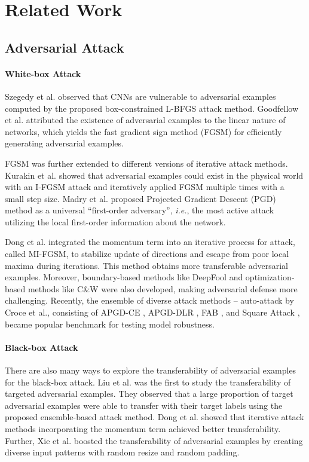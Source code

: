 \documentclass[10pt,twocolumn,letterpaper]{article}
\begin{document}
\section{Related Work}
\subsection{Adversarial Attack}
\paragraph{White-box Attack}
Szegedy et al.  \cite{DBLP:journals/corr/SzegedyZSBEGF13} observed that CNNs are vulnerable to adversarial examples computed by the proposed box-constrained L-BFGS attack method. Goodfellow et al. \cite{DBLP:journals/corr/GoodfellowSS14} attributed the existence of adversarial examples to the linear nature of networks, which yields the fast gradient sign method (FGSM) for efficiently generating adversarial examples. 

FGSM was further extended to different versions of iterative attack methods. Kurakin et al. \cite{DBLP:conf/iclr/KurakinGB17a} showed that adversarial examples could exist in the physical world with an I-FGSM attack and iteratively applied FGSM multiple times with a small step size.  Madry et al. \cite{DBLP:conf/iclr/MadryMSTV18} proposed Projected Gradient Descent (PGD) method as a universal “first-order adversary”, {\it i.e.}, the most active attack utilizing the local first-order information about the network. 

Dong et al. \cite{DBLP:conf/cvpr/DongLPS0HL18} integrated the momentum term into an iterative process for attack, called MI-FGSM, to stabilize update of directions and escape from poor local maxima during iterations. This method obtains more transferable adversarial examples. Moreover, boundary-based methods like DeepFool \cite{DBLP:conf/cvpr/Moosavi-Dezfooli16} and optimization-based methods like C\&W \cite{DBLP:conf/sp/Carlini017} were also developed, making adversarial defense more challenging. Recently, the ensemble of diverse attack methods -- auto-attack \cite{croce2020reliable} by Croce et al., consisting of APGD-CE \cite{croce2020reliable}, APGD-DLR \cite{croce2020reliable}, FAB \cite{croce2020minimally}, and Square Attack \cite{ACFH2020square}, became popular benchmark for testing model robustness.  

\paragraph{Black-box Attack}
There are also many ways to explore the transferability of adversarial examples for the black-box attack. Liu et al. \cite{DBLP:conf/iclr/LiuCLS17} was the first to study the transferability of targeted adversarial examples. They observed that a large proportion
of target adversarial examples were able to transfer with their target labels using the proposed ensemble-based attack method. Dong et al. \cite{DBLP:conf/cvpr/DongLPS0HL18} showed that iterative attack methods incorporating the momentum term achieved better transferability. Further, Xie et al. \cite{DBLP:conf/cvpr/XieZZBWRY19} boosted the transferability of adversarial examples by creating diverse input patterns with random resize and random padding.
\end{document}
